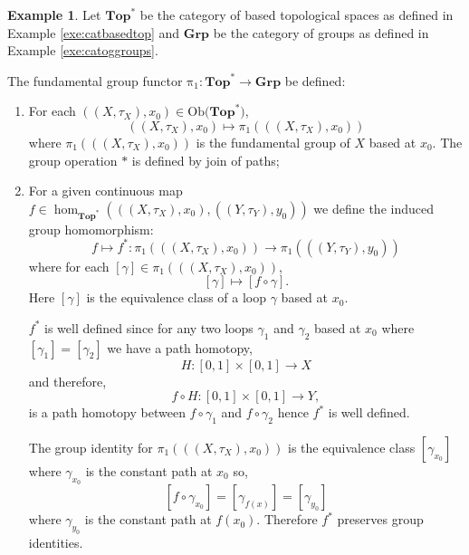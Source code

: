 \documentclass[11pt,a4paper]{article}
\theoremstyle{definition}
\newtheorem{example}[thm]{Example}
\newcommand\ho[3][]{\hom_{#1}(#2,#3)}
\newcommand\ob[1]{\mathrm{Ob(}#1\mathrm{)}}
\newcommand\func[3]{\mathrm{#1}\colon#2\rightarrow#3}
\numberwithin{equation}{section}
\begin{document}
\begin{example}
    Let $\mathbf{Top}^*$ be the category of based topological spaces as defined in Example \ref{exe:catbasedtop} and $\mathbf{Grp}$ be the category of groups as defined in Example \ref{exe:catoggroups}. 
    
    The fundamental group functor $\func{\pi_{1}}{\mathbf{Top}^{*}}{\mathbf{Grp}}$ be defined:
    \begin{enumerate}
        \item For each $((X,\tau_X),x_{0})\in\ob{\mathbf{Top}^*}$,
        \[((X,\tau_X),x_{0})\mapsto\pi_1(((X,\tau_X),x_{0}))\]
        where $\pi_1(((X,\tau_X),x_{0}))$ is the fundamental group of $X$ based at $x_{0}$. The group operation $*$ is defined by join of paths;
        
        \item For a given continuous map $f\in\ho[\mathbf{Top}^*]{((X,\tau_X),x_{0})}{((Y,\tau_Y),y_{0})}$ we define the induced group homomorphism:
        \[f\mapsto f^*\colon\pi_1(((X,\tau_X),x_{0}))\to\pi_1(((Y,\tau_Y),y_{0}))\]
        where for each $[\gamma]\in \pi_1(((X,\tau_X),x_{0}))$,
        \[ [\gamma] \mapsto [f\circ \gamma].\]
        Here $[\gamma]$ is the equivalence class of a loop $\gamma$ based at $x_{0}$.
        
        $f^*$ is well defined since for any two loops $\gamma_1$ and $\gamma_2$ based at $x_0$ where $[\gamma_1] = [\gamma_2]$ we have a path homotopy, 
        \[H\colon [0,1] \times [0,1] \to X\]
        and therefore,
        \[f\circ H \colon [0,1]\times [0,1]\to Y,\]
        is a path homotopy between $f\circ \gamma_1$ and $f\circ\gamma_2$ hence $f^*$ is well defined.
        
        The group identity for $\pi_1(((X,\tau_X),x_{0}))$ is the equivalence class $[\gamma_{x_{0}}]$ where $\gamma_{x_{0}}$ is the constant path at $x_{0}$ so,
        \[[f\circ\gamma_{x_{0}}] = [\gamma_{f(x)}] = [\gamma_{y_{0}}]\] 
        where $\gamma_{y_{0}}$ is the constant path at $f(x_{0})$. Therefore $f^*$ preserves group identities. 
        

\end{enumerate}
\end{example}
\end{document}
